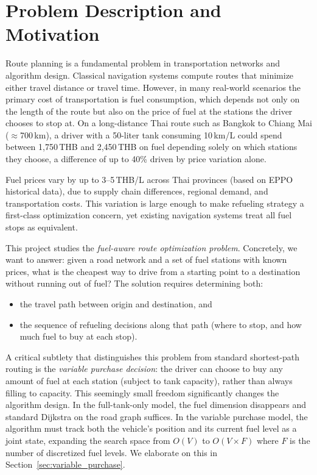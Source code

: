 \chapter{Problem Description and Motivation}

Route planning is a fundamental problem in transportation networks and algorithm design.
Classical navigation systems compute routes that minimize either travel distance or travel time.
However, in many real-world scenarios the primary cost of transportation is fuel consumption,
which depends not only on the length of the route but also on the price of fuel at the stations
the driver chooses to stop at.
On a long-distance Thai route such as Bangkok to Chiang Mai ($\approx$700\,km), a driver
with a 50-liter tank consuming 10\,km/L could spend between 1,750\,THB and 2,450\,THB
on fuel depending solely on which stations they choose, a difference of up to 40\% driven by
price variation alone.

Fuel prices vary by up to 3--5\,THB/L across Thai provinces (based on EPPO historical
data), due to supply chain differences, regional demand, and transportation costs.
This variation is large enough to make refueling strategy a first-class optimization concern,
yet existing navigation systems treat all fuel stops as equivalent.

This project studies the \textit{fuel-aware route optimization problem}.
Concretely, we want to answer: given a road network and a set of fuel stations with known
prices, what is the cheapest way to drive from a starting point to a destination without running
out of fuel?
The solution requires determining both:
\begin{itemize}
    \item the travel path between origin and destination, and
    \item the sequence of refueling decisions along that path (where to stop, and how much
          fuel to buy at each stop).
\end{itemize}

A critical subtlety that distinguishes this problem from standard shortest-path routing is the
\textit{variable purchase decision}: the driver can choose to buy any amount of fuel at each
station (subject to tank capacity), rather than always filling to capacity.
This seemingly small freedom significantly changes the algorithm design.
In the full-tank-only model, the fuel dimension disappears and standard Dijkstra on the road
graph suffices.
In the variable purchase model, the algorithm must track both the vehicle's position and its
current fuel level as a joint state, expanding the search space from $O(V)$ to $O(V \times F)$
where $F$ is the number of discretized fuel levels.
We elaborate on this in Section~\ref{sec:variable_purchase}.

